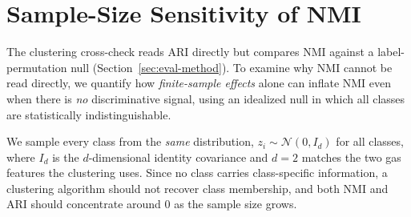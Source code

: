 \section{Sample-Size Sensitivity of NMI}
\label{app:nmi-sensitivity}

The clustering cross-check reads ARI directly but compares NMI against a label-permutation null (Section~\ref{sec:eval-method}).
To examine why NMI cannot be read directly, we quantify how \emph{finite-sample effects} alone can inflate NMI
even when there is \emph{no} discriminative signal, using an idealized null in which all
classes are statistically indistinguishable.

We sample every class from the \emph{same} distribution, $z_{i}\sim\mathcal{N}(0,I_{d})$ for all classes, where $I_d$ is the $d$-dimensional identity covariance and $d=2$ matches the two gas features the clustering uses.
Since no class carries class-specific information, a clustering algorithm should not recover class membership,
and both NMI and ARI should concentrate around $0$ as the sample size grows.

